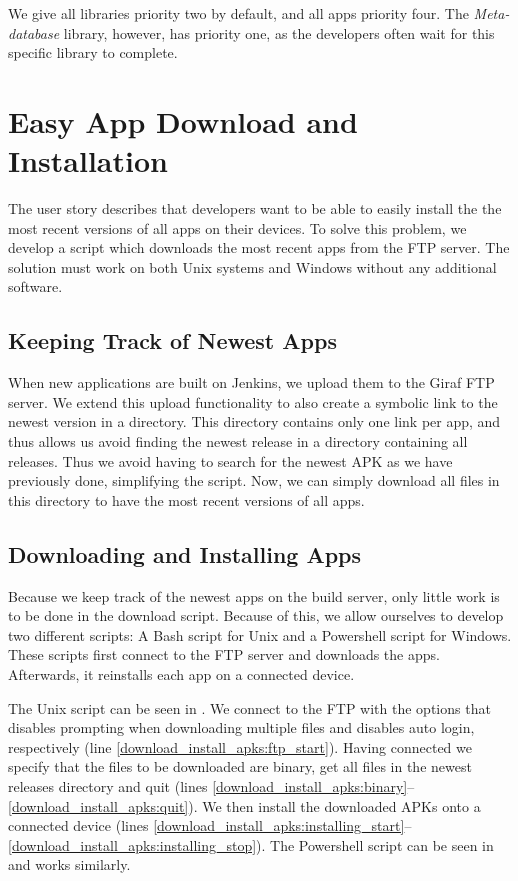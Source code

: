 We give all libraries priority two by default, and all apps priority four. The \emph{Meta-database} library, however, has priority one, as the developers often wait for this specific library to complete.

\section{Easy App Download and Installation}\label{sec:appdownloadscript}
The user story  describes that developers want to be able to easily install the the most recent versions of all apps on their devices. To solve this problem, we develop a script which downloads the most recent apps from the FTP server. The solution must work on both Unix systems and Windows without any additional software.

\subsection{Keeping Track of Newest Apps}
When new applications are built on Jenkins, we upload them to the Giraf FTP server. We extend this upload functionality to also create a symbolic link to the newest version in a  directory. This directory contains only one link per app, and thus allows us avoid finding the newest release in a directory containing all releases. Thus we avoid having to search for the newest APK as we have previously done, simplifying the script. Now, we can simply download all files in this directory to have the most recent versions of all apps.

\subsection{Downloading and Installing Apps}
Because we keep track of the newest apps on the build server, only little work is to be done in the download script. Because of this, we allow ourselves to develop two different scripts: A Bash script for Unix and a Powershell script for Windows. These scripts first connect to the FTP server and downloads the apps. Afterwards, it reinstalls each app on a connected device.

The Unix script can be seen in . We connect to the FTP with the  options that disables prompting when downloading multiple files and disables auto login, respectively (line \ref{download_install_apks:ftp_start}). Having connected we specify that the files to be downloaded are binary, get all files in the newest releases directory and quit (lines \ref{download_install_apks:binary}--\ref{download_install_apks:quit}). We then install the downloaded APKs onto a connected device (lines \ref{download_install_apks:installing_start}--\ref{download_install_apks:installing_stop}). The Powershell script can be seen in  and works similarly.

